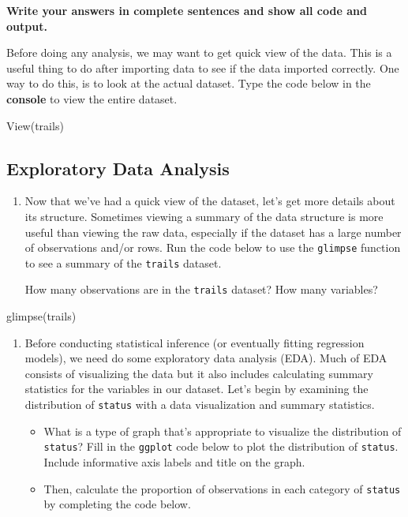 \documentclass[
]{article}
\newenvironment{Shaded}{\begin{snugshade}}{\end{snugshade}}
\newcommand{\FunctionTok}[1]{\textcolor[rgb]{0.00,0.00,0.00}{#1}}
\newcommand{\NormalTok}[1]{#1}
\begin{document}
\textbf{Write your answers in complete sentences and show all code and
output.}

Before doing any analysis, we may want to get quick view of the data.
This is a useful thing to do after importing data to see if the data
imported correctly. One way to do this, is to look at the actual
dataset. Type the code below in the \textbf{console} to view the entire
dataset.

\begin{Shaded}
\begin{Highlighting}[]
\FunctionTok{View}\NormalTok{(trails)}
\end{Highlighting}
\end{Shaded}

\hypertarget{exploratory-data-analysis}{%
\subsection{Exploratory Data Analysis}\label{exploratory-data-analysis}}

\begin{enumerate}
\def\labelenumi{\arabic{enumi}.}
\item
  Now that we've had a quick view of the dataset, let's get more details
  about its structure. Sometimes viewing a summary of the data structure
  is more useful than viewing the raw data, especially if the dataset
  has a large number of observations and/or rows. Run the code below to
  use the \texttt{glimpse} function to see a summary of the
  \texttt{trails} dataset.

  How many observations are in the \texttt{trails} dataset? How many
  variables?
\end{enumerate}

\begin{Shaded}
\begin{Highlighting}[]
\FunctionTok{glimpse}\NormalTok{(trails)}
\end{Highlighting}
\end{Shaded}

\begin{enumerate}
\def\labelenumi{\arabic{enumi}.}
\setcounter{enumi}{1}
\item
  Before conducting statistical inference (or eventually fitting
  regression models), we need do some exploratory data analysis (EDA).
  Much of EDA consists of visualizing the data but it also includes
  calculating summary statistics for the variables in our dataset. Let's
  begin by examining the distribution of \texttt{status} with a data
  visualization and summary statistics.

  \begin{itemize}
  \item
    What is a type of graph that's appropriate to visualize the
    distribution of \texttt{status}? Fill in the \texttt{ggplot} code
    below to plot the distribution of \texttt{status}. Include
    informative axis labels and title on the graph.
  \item
    Then, calculate the proportion of observations in each category of
    \texttt{status} by completing the code below.
  \end{itemize}
\end{enumerate}
\end{document}
